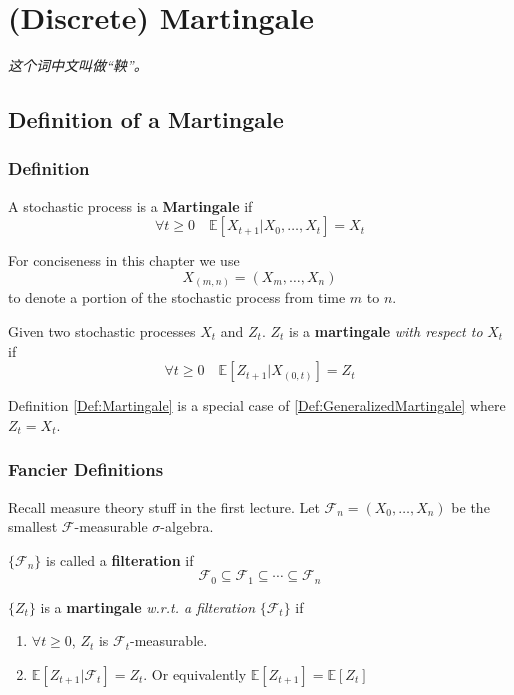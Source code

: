 \chapter{(Discrete) Martingale}
\emph{这个词中文叫做“鞅”。}
\newpage


\section{Definition of a Martingale}
    \subsection{Definition}
        \begin{definition}[Martingale]\label{Def:Martingale}
            A stochastic process is a \textbf{Martingale} if
            \[ \forall t \ge 0 \quad \mathbb{E}[X_{t+1}|X_0,\dots,X_t] = X_t \]
        \end{definition}

        For conciseness in this chapter we use
        \[ X_{(m,n)} = (X_m,\dots,X_n) \]
        to denote a portion of the stochastic process from time $m$ to $n$.

        \begin{definition}\label{Def:GeneralizedMartingale}
            Given two stochastic processes $X_t$ and $Z_t$. $Z_t$ is a \textbf{martingale} \emph{with respect to} $X_t$ if
            \[ \forall t \ge 0 \quad \mathbb{E}[Z_{t+1} | X_{(0,t)}] = Z_t \]
        \end{definition}
        \begin{remark}
            Definition \ref{Def:Martingale} is a special case of \ref{Def:GeneralizedMartingale} where $Z_t = X_t$.
        \end{remark}

    \subsection{Fancier Definitions}
        Recall measure theory stuff in the first lecture.
        Let $\mathcal{F}_n = (X_0,\dots,X_n)$ be the smallest $\mathcal{F}$-measurable $\sigma$-algebra.
        \begin{definition}[Filteration]
            $\{\mathcal{F}_n\}$ is called a \textbf{filteration} if
            \[ \mathcal{F}_0 \subseteq \mathcal{F}_1 \subseteq \cdots \subseteq \mathcal{F}_n \]
        \end{definition}

        \begin{definition}\label{Def:FancyMartingale}
            $\{Z_t\}$ is a \textbf{martingale} \emph{w.r.t. a filteration} $\{\mathcal{F}_t\}$ if
            \begin{enumerate}
                \item $\forall t \ge 0$, $Z_t$ is $\mathcal{F}_t$-measurable.
                \item $\mathbb{E}[Z_{t+1}|\mathcal{F}_t] = Z_t$. Or equivalently $\mathbb{E}[Z_{t+1}] = \mathbb{E}[Z_t]$
            \end{enumerate}
        \end{definition}

